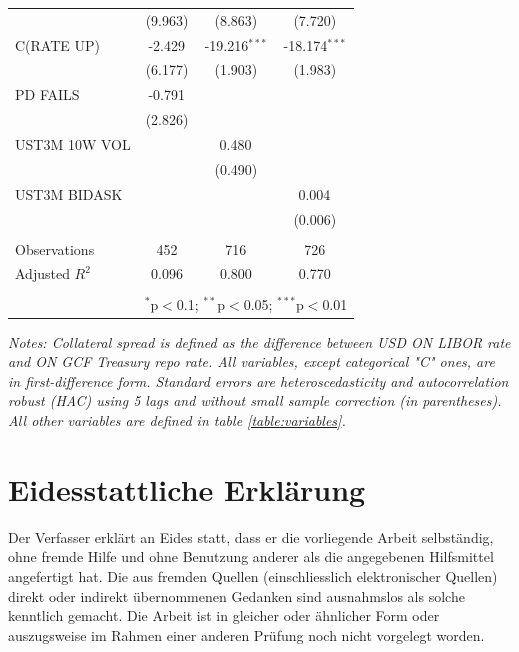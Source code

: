 \documentclass[11pt,a4paper,english,oneside]{article}
\begin{document}
\begin{appendices}
\begin{table}[!htbp]
\begin{tabular}{@{\extracolsep{5pt}}lccc}
  & (9.963) & (8.863) & (7.720) \\
 C(RATE UP) & -2.429$^{}$ & -19.216$^{***}$ & -18.174$^{***}$ \\
  & (6.177) & (1.903) & (1.983) \\
 PD FAILS & -0.791$^{}$ & & \\
  & (2.826) & & \\
 UST3M 10W VOL & & 0.480$^{}$ & \\
  & & (0.490) & \\
 UST3M BIDASK & & & 0.004$^{}$ \\
  & & & (0.006) \\
\hline \\[-1.8ex]
 Observations & 452 & 716 & 726 \\
 Adjusted $R^2$ & 0.096 & 0.800 & 0.770 \\
\hline
\hline \\[-1.8ex]
 & \multicolumn{3}{r}{$^{*}$p$<$0.1; $^{**}$p$<$0.05; $^{***}$p$<$0.01} \\
\end{tabular}
\begin{flushleft}
\vspace{-5pt}
  \textit{Notes: Collateral spread is defined as the difference between USD ON LIBOR rate and ON GCF Treasury repo rate. All variables, except categorical "C" ones, are in first-difference form. Standard errors are heteroscedasticity and autocorrelation robust (HAC) using 5 lags and without small sample correction (in parentheses). All other variables are defined in table \ref{table:variables}.}
\end{flushleft}
\end{table}

\end{appendices}

\newpage


\newpage
{}
\thispagestyle{firststyle}
\section*{Eidesstattliche Erklärung}
Der Verfasser erklärt an Eides statt, dass er die vorliegende Arbeit selbständig, ohne fremde Hilfe und ohne Benutzung anderer als die angegebenen Hilfsmittel angefertigt hat. Die aus fremden Quellen (einschliesslich elektronischer Quellen) direkt oder indirekt übernommenen Gedanken sind ausnahmslos als solche kenntlich gemacht. Die Arbeit ist in gleicher oder ähnlicher Form oder auszugsweise im Rahmen einer anderen Prüfung noch nicht vorgelegt worden.\\[2cm]

 \hfill {}
\end{document}
